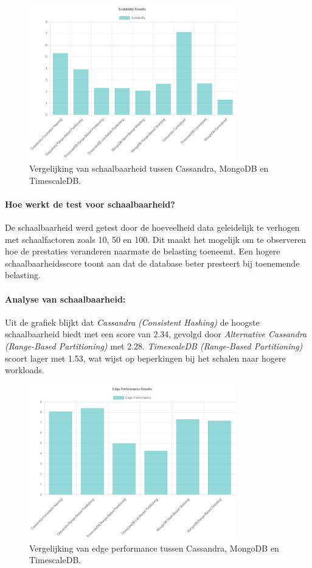 \begin{figure}[H]
	\centering
	\includegraphics[width=0.8\textwidth]{Scalability.png}
	\caption{Vergelijking van schaalbaarheid tussen Cassandra, MongoDB en TimescaleDB.}
	\label{fig:scalability-comparison}
\end{figure}

\paragraph{Hoe werkt de test voor schaalbaarheid?} 
De schaalbaarheid werd getest door de hoeveelheid data geleidelijk te verhogen met schaalfactoren zoals 10, 50 en 100. Dit maakt het mogelijk om te observeren hoe de prestaties veranderen naarmate de belasting toeneemt. Een hogere schaalbaarheidsscore toont aan dat de database beter presteert bij toenemende belasting.

\paragraph{Analyse van schaalbaarheid:}
Uit de grafiek blijkt dat \textit{Cassandra (Consistent Hashing)} de hoogste schaalbaarheid biedt met een score van 2.34, gevolgd door \textit{Alternative Cassandra (Range-Based Partitioning)} met 2.28. \textit{TimescaleDB (Range-Based Partitioning)} scoort lager met 1.53, wat wijst op beperkingen bij het schalen naar hogere workloads.

\begin{figure}[H]
	\centering
	\includegraphics[width=0.8\textwidth]{Edge_Performance.png}
	\caption{Vergelijking van edge performance tussen Cassandra, MongoDB en TimescaleDB.}
	\label{fig:edgeperformance-comparison}
\end{figure}

